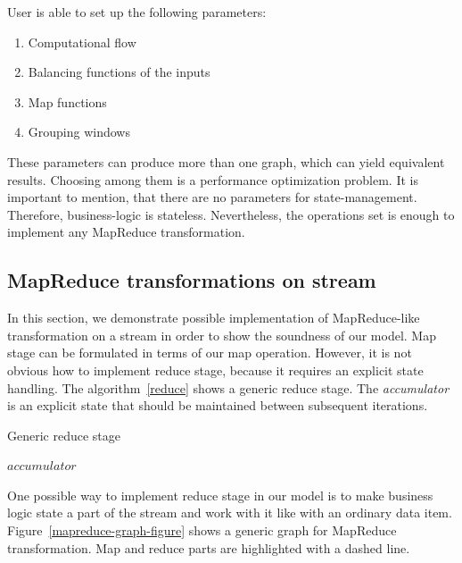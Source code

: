 User is able to set up the following parameters:

\begin{enumerate}
  \item{Computational flow}
  \item{Balancing functions of the inputs}
  \item{Map functions}
  \item{Grouping windows}
\end{enumerate}

These parameters can produce more than one graph, which can yield equivalent results. Choosing among them is a performance optimization problem.    
It is important to mention, that there are no parameters for state-management. Therefore, business-logic is stateless. Nevertheless, the operations set is enough to implement any MapReduce transformation.

\subsection{MapReduce transformations on stream}
\label{fs-map-reduce}

In this section, we demonstrate possible implementation of MapReduce-like transformation on a stream in order to show the soundness of our model. Map stage can be formulated in terms of our map operation. However, it is not obvious how to implement reduce stage, because it requires an explicit state handling. The algorithm~\ref{reduce} shows a generic reduce stage. The {\it accumulator} is an explicit state that should be maintained between subsequent iterations.

\begin{algorithm}
\caption{Generic reduce stage}
\label{reduce}
\begin{algorithmic}
    \State $accumulator$ 
      \State {}
    \EndFor
    \State \Return {}
  \EndFunction
\end{algorithmic}
\end{algorithm}

One possible way to implement reduce stage in our model is to make business logic state a part of the stream and work with it like with an ordinary data item. Figure~\ref{mapreduce-graph-figure} shows a generic graph for MapReduce transformation. Map and reduce parts are highlighted with a dashed line.

